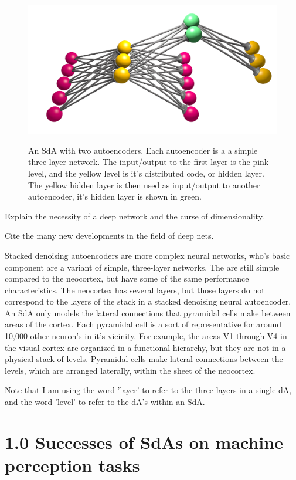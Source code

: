 \documentclass[11pt]{article}
\begin{document}
\begin{figure}[htb]
\begin{center}
\includegraphics[height=2.585in,width=5in]{sda_fig}
\caption{An SdA with two autoencoders. Each autoencoder is a a simple three layer network. The input/output to the first layer is the pink level, and the yellow level is it's distributed code, or hidden layer. The yellow hidden layer is then used as input/output to another autoencoder, it's hidden layer is shown in green.}
\end{center}
\end{figure}

Explain the necessity of a deep network and the curse of dimensionality.

Cite the many new developments in the field of deep nets.

Stacked denoising autoencoders are more complex neural networks, who's basic component are a variant of simple, three-layer networks. The are still simple compared to the neocortex, but have some of the same performance characteristics. The neocortex has several layers, but those layers do not correspond to the layers of the stack in a stacked denoising neural autoencoder. An SdA only models the lateral connections that pyramidal cells make between areas of the cortex. Each pyramidal cell is a sort of representative for around 10,000 other neuron's in it's vicinity.  For example, the areas V1 through V4 in the visual cortex are organized in a functional hierarchy, but they are not in a physical stack of levels. Pyramidal cells make lateral connections between the levels, which are arranged laterally, within the sheet of the neocortex.

Note that I am using the word 'layer' to refer to the three layers in a single dA, and the word 'level' to refer to the dA's within an SdA.

\section{1.0 Successes of SdAs on machine perception tasks}
\label{Successes of SdAs on machine perception tasks}
\end{document}
